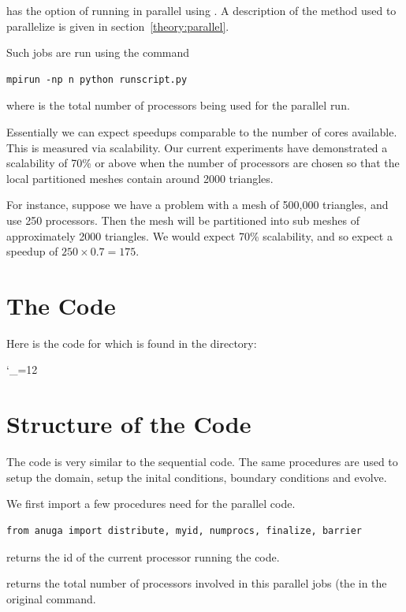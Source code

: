 \documentclass{manual}
\newcommand{\verbatiminputB}[1]{%
\endgroup}
\def\verbatiminputunderscore{\begingroup 
\catcode`\_=12
\verbatiminputB}
\begin{document}
\anuga has the option of running in parallel using \mpi. A description of the method used to parallelize \anuga is given in section~\ref{theory:parallel}.

Such jobs are run using the command

\begin{verbatim}
mpirun -np n python runscript.py
\end{verbatim}
where  is the total number of processors being used for the parallel run. 

Essentially we can expect speedups comparable to the number of cores available. This is measured via scalability. Our current experiments have demonstrated a scalability of 70\% or above when the number of processors are chosen so that the local partitioned meshes contain around 2000 triangles. 

For instance, suppose we have a problem with a mesh of 500,000 triangles, and use 250 processors. Then the mesh will be partitioned into sub meshes of approximately 2000 triangles. 
We would expect 70\% scalability, and so expect a speedup of $250 \times 0.7 = 175$. 

\section{The Code}

Here is the code for  which is found in the  directory:

\verbatiminputunderscore{../../anuga_core/examples/cairns/runParallelCairns.py}


\section{Structure of the Code}

The code is very similar to the sequential code. The same procedures are used to setup the domain, setup the inital conditions, boundary conditions and evolve. 


We first import a few procedures  need for the parallel code.
\begin{verbatim}
from anuga import distribute, myid, numprocs, finalize, barrier
\end{verbatim}

 returns the id of the current processor running the code. 

 returns the total number of processors involved in this parallel jobs (the  in the original  command. 
\end{document}
